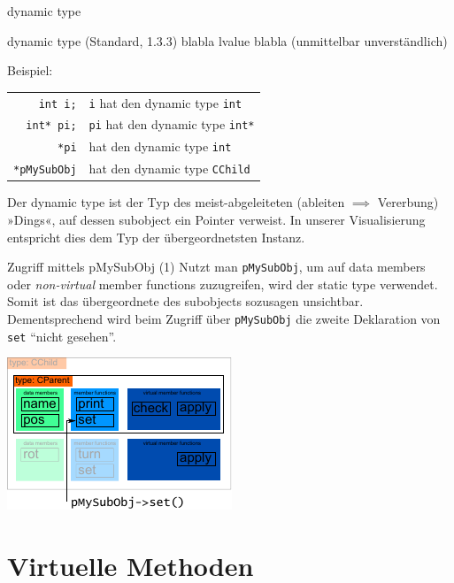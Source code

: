 \begin{frame}[fragile]{dynamic type}
	\begin{block}{dynamic type (Standard, 1.3.3)}
		blabla lvalue blabla (unmittelbar unverständlich)
	\end{block}
	
	\vspace{2em}
	
	Beispiel:
	\begin{tabular}{r|l}
		\verb|int i;|	& \verb|i| hat den dynamic type \verb|int|	\\
		\verb|int* pi;|	& \verb|pi| hat den dynamic type \verb|int*|	\\
		\verb|*pi|	&	hat den dynamic type \verb|int|	\\
		\verb|*pMySubObj|	&	hat den dynamic type \verb|CChild|	\\
	\end{tabular}
	
	\vspace{1em}
	
	Der dynamic type ist der Typ des meist-abgeleiteten (ableiten $\implies$ Vererbung) »Dings«, auf dessen subobject ein Pointer verweist. In unserer Visualisierung entspricht dies dem Typ der übergeordnetsten Instanz.
\end{frame}

\begin{frame}[fragile,b]{Zugriff mittels pMySubObj (1)}
	Nutzt man \verb|pMySubObj|, um auf data members oder \emph{non-virtual} member functions zuzugreifen, wird der static type verwendet. Somit ist das übergeordnete des subobjects sozusagen unsichtbar. Dementsprechend wird beim Zugriff über \verb|pMySubObj| die zweite Deklaration von \verb|set| \enquote{nicht gesehen}.
	
	\vspace{2em}
	
	\includegraphics[width=0.5\linewidth]{images/pMySubObj-set}
\end{frame}


\section{Virtuelle Methoden}

